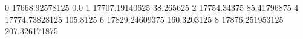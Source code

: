 0 17668.92578125 0.0
1 17707.19140625 38.265625
2 17754.34375 85.41796875
4 17774.73828125 105.8125
6 17829.24609375 160.3203125
8 17876.251953125 207.326171875
